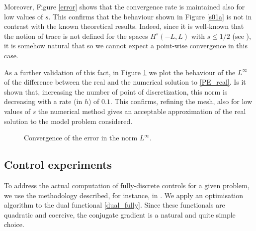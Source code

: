 Moreover, Figure \ref{error} shows that the convergence rate is maintained also for low values of $s$. This confirms that the behaviour shown in Figure \ref{s01a} is not in contrast with the known theoretical results. Indeed, since it is well-known that the notion of trace is not defined for the spaces $H^s(-L,L)$ with $s\leq 1/2$ (see \cite{lions1968problemes,tartar2007introduction}), it is somehow natural that so we cannot expect a point-wise convergence in this case.  

As a further validation of this fact, in Figure \ref{linfty_error} we plot the behaviour of the $L^{\infty}$ of the difference between the real and the numerical solution to \eqref{PE_real}. Is it shown that, increasing the number of point of discretization, this norm is decreasing with a rate (in $h$) of $0.1$. This confirms, refining the mesh, also for low values of $s$ the numerical method gives an acceptable approximation of the real solution to the model problem considered.    

\begin{figure}[!]
\centering

\caption{Convergence of the error in the norm $L^\infty$.}\label{linfty_error}
\end{figure}

\subsection{Control experiments}
%
To address the actual computation of fully-discrete controls for a given problem, we use the methodology described, for instance, in \cite{}. We apply an optimisation algorithm to the dual functional \eqref{dual_fully}. Since these functionals are quadratic and coercive, the conjugate gradient is a natural and quite simple choice.

